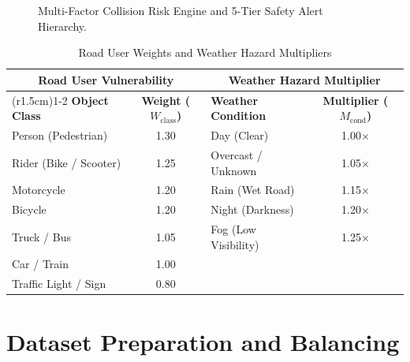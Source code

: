 \documentclass{article}
\begin{document}
\begin{figure}[!ht]
\caption{Multi-Factor Collision Risk Engine and 5-Tier Safety Alert Hierarchy.}
\label{fig:tikz_risk}
\end{figure}

\begin{table}[!ht]
\centering
\small
\caption{Road User Weights and Weather Hazard Multipliers}
\label{tab:risk_weights}
\begin{tabular}{lc@{\hspace{1.5cm}}lc}
\toprule
\multicolumn{2}{c}{\textbf{Road User Vulnerability}} & \multicolumn{2}{c}{\textbf{Weather Hazard Multiplier}} \\
\cmidrule(r{1.5cm}){1-2} \cmidrule{3-4}
\textbf{Object Class} & \textbf{Weight ($W_{\text{class}}$)} & \textbf{Weather Condition} & \textbf{Multiplier ($M_{\text{cond}}$)} \\
\midrule
Person (Pedestrian) & 1.30 & Day (Clear) & 1.00$\times$ \\
Rider (Bike / Scooter) & 1.25 & Overcast / Unknown & 1.05$\times$ \\
Motorcycle & 1.20 & Rain (Wet Road) & 1.15$\times$ \\
Bicycle & 1.20 & Night (Darkness) & 1.20$\times$ \\
Truck / Bus & 1.05 & Fog (Low Visibility) & 1.25$\times$ \\
Car / Train & 1.00 & & \\
Traffic Light / Sign & 0.80 & & \\
\bottomrule
\end{tabular}
\end{table}

\newpage
\section{Dataset Preparation and Balancing}
\label{sec:dataset}
\end{document}
